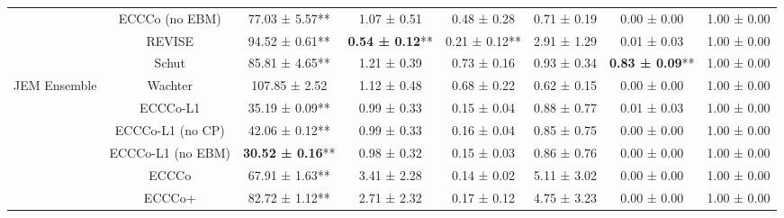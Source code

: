 \begin{table}
{\begin{tabular}[t]{cccccccc}
 & ECCCo (no EBM) & 77.03 ± 5.57** & 1.07 ± 0.51\hphantom{*}\hphantom{*} & 0.48 ± 0.28\hphantom{*}\hphantom{*} & 0.71 ± 0.19\hphantom{*}\hphantom{*} & 0.00 ± 0.00\hphantom{*}\hphantom{*} & 1.00 ± 0.00\hphantom{*}\hphantom{*}\\

 & REVISE & 94.52 ± 0.61** & \textbf{0.54 ± 0.12}** & 0.21 ± 0.12** & 2.91 ± 1.29\hphantom{*}\hphantom{*} & 0.01 ± 0.03\hphantom{*}\hphantom{*} & 1.00 ± 0.00\hphantom{*}\hphantom{*}\\

 & Schut & 85.81 ± 4.65** & 1.21 ± 0.39\hphantom{*}\hphantom{*} & 0.73 ± 0.16\hphantom{*}\hphantom{*} & 0.93 ± 0.34\hphantom{*}\hphantom{*} & \textbf{0.83 ± 0.09}** & 1.00 ± 0.00\hphantom{*}\hphantom{*}\\

\multirow[t]{-10}{*}{\centering\arraybackslash JEM Ensemble} & Wachter & 107.85 ± 2.52\hphantom{*}\hphantom{*} & 1.12 ± 0.48\hphantom{*}\hphantom{*} & 0.68 ± 0.22\hphantom{*}\hphantom{*} & 0.62 ± 0.15\hphantom{*}\hphantom{*} & 0.00 ± 0.00\hphantom{*}\hphantom{*} & 1.00 ± 0.00\hphantom{*}\hphantom{*}\\
\cmidrule{1-8}
 & ECCCo-L1 & 35.19 ± 0.09** & 0.99 ± 0.33\hphantom{*}\hphantom{*} & 0.15 ± 0.04\hphantom{*}\hphantom{*} & 0.88 ± 0.77\hphantom{*}\hphantom{*} & 0.01 ± 0.03\hphantom{*}\hphantom{*} & 1.00 ± 0.00\hphantom{*}\hphantom{*}\\

 & ECCCo-L1 (no CP) & 42.06 ± 0.12** & 0.99 ± 0.33\hphantom{*}\hphantom{*} & 0.16 ± 0.04\hphantom{*}\hphantom{*} & 0.85 ± 0.75\hphantom{*}\hphantom{*} & 0.00 ± 0.00\hphantom{*}\hphantom{*} & 1.00 ± 0.00\hphantom{*}\hphantom{*}\\

 & ECCCo-L1 (no EBM) & \textbf{30.52 ± 0.16}** & 0.98 ± 0.32\hphantom{*}\hphantom{*} & 0.15 ± 0.03\hphantom{*}\hphantom{*} & 0.86 ± 0.76\hphantom{*}\hphantom{*} & 0.00 ± 0.00\hphantom{*}\hphantom{*} & 1.00 ± 0.00\hphantom{*}\hphantom{*}\\

 & ECCCo & 67.91 ± 1.63** & 3.41 ± 2.28\hphantom{*}\hphantom{*} & 0.14 ± 0.02\hphantom{*}\hphantom{*} & 5.11 ± 3.02\hphantom{*}\hphantom{*} & 0.00 ± 0.00\hphantom{*}\hphantom{*} & 1.00 ± 0.00\hphantom{*}\hphantom{*}\\

 & ECCCo+ & 82.72 ± 1.12** & 2.71 ± 2.32\hphantom{*}\hphantom{*} & 0.17 ± 0.12\hphantom{*}\hphantom{*} & 4.75 ± 3.23\hphantom{*}\hphantom{*} & 0.00 ± 0.00\hphantom{*}\hphantom{*} & 1.00 ± 0.00\hphantom{*}\hphantom{*}\\


\end{tabular}}
\end{table}
